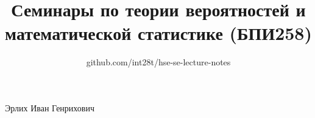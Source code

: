 \documentclass[a4paper,12pt]{article}
\title{Семинары по теории вероятностей и математической статистике (БПИ258)}
\author{github.com/int28t/hse-se-lecture-notes}
\date{}
\begin{document}
    \pagestyle{empty}
	\maketitle
    \thispagestyle{empty}
    \begin{flushright}
		Эрлих Иван Генрихович\\
	\end{flushright}
    \hypertarget{contents}{}
	\tableofcontents{}
    \newpage
    \pagestyle{plain}

    
    \clearpage
    
    \clearpage
    
    \clearpage
    
    \clearpage
    
    \clearpage
    
    \clearpage
    
\end{document}
